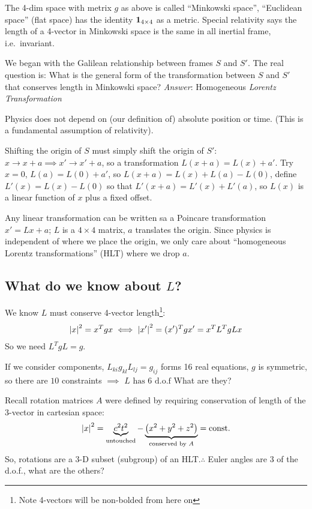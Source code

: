 The 4-dim space with metrix $g$ as above is called ``Minkowski space'',
``Euclidean space'' (flat space) has the identity $\bm{1}_{4\times4}$ as a metric. Special relativity says the length of a 4-vector in Minkowski space is the same in all inertial frame, i.e.\ invariant.

We began with the Galilean relationship between frames $S$ and $S'$. The real question is: What is the general form of the transformation between $S$ and $S'$ that conserves length in Minkowski space? \emph{Answer}: Homogeneous \emph{Lorentz Transformation}

Physics does not depend on (our definition of) absolute position or time. (This is a fundamental assumption of relativity).

Shifting the origin of $S$ must simply shift the origin of $S'$: $x\to x+a\implies x'\to x'+a$, so a transformation $L(x+a)=L(x)+a'$. Try $x=0$, $L(a)=L(0)+a'$, so $L(x+a)=L(x)+L(a)-L(0)$, define $L'(x)=L(x)-L(0)$ so that $L'(x+a)=L'(x)+L'(a)$, so $L(x)$ is a linear function of  $x$ plus a fixed offset.

Any linear transformation can be written sa a Poincare transformation $x'=Lx+a$; $L$ is a $4\times4$ matrix, $a$ translates the origin. Since physics is independent of where we place the origin, we only care about ``homogeneous Lorentz transformations'' (HLT) where we drop $a$.

\subsection{What do we know about $L$?}
We know $L$ must conserve 4-vector length\footnote{Note 4-vectors will be non-bolded from here on}:
\begin{align*}
  \abs{x}^2=x^T g x\iff \abs{x'}^2=(x')^T gx'=x^TL^TgLx
\end{align*}
So we need $\boxed{L^T gL=g}$.

If we consider components, $L_{ki}g_{kl}L_{lj}=g_{ij}$ forms 16 real equations, $g$ is symmetric, so there are $10$ constraints $\implies$ $\boxed{L\text{ has 6 d.o.f}}$ What are they?

Recall rotation matrices $A$ were defined by requiring conservation of length of the 3-vector in cartesian space:
\begin{align*}
  \abs{x}^2=\underbrace{c^2t^2}_{\text{untouched}}
  -\underbrace{\qty(x^2+y^2+z^2)}_{\text{conserved by }A}
  =\text{const.}
\end{align*}
So, rotations are a 3-D subset (subgroup) of an HLT.\@ $\therefore$ Euler angles are 3 of the d.o.f., what are the others?

